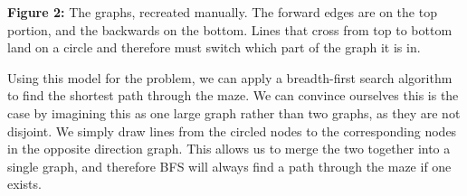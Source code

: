 \documentclass[12pt]{article}
\begin{document}
\begin{center}
    \textbf{Figure 2:} The graphs, recreated manually. The forward
    edges are on the top portion, and the backwards on the bottom.
    Lines that cross from top to bottom land on a circle and therefore
    must switch which part of the graph it is in.
\end{center}
\pagebreak

Using this model for the problem, we can apply a breadth-first search algorithm
to find the shortest path through the maze. We can convince ourselves this is
the case by imagining this as one large graph rather than two graphs, as they are
not disjoint. We simply draw lines from the circled nodes to the corresponding nodes
in the opposite direction graph. This allows us to merge the two together into a 
single graph, and therefore BFS will always find a path through the maze if one exists.
\end{document}
